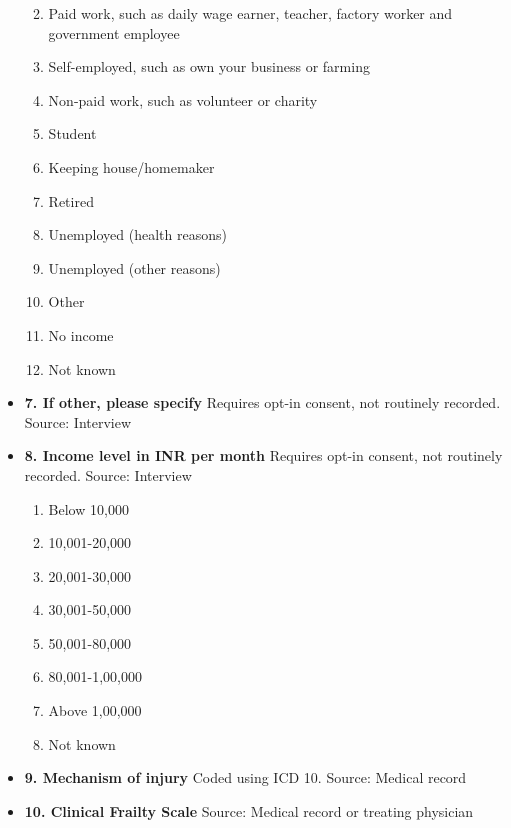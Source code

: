 \documentclass[
]{scrartcl}
\providecommand{\tightlist}{%
  \setlength{\itemsep}{0pt}\setlength{\parskip}{0pt}}\usepackage{longtable,booktabs,array}
\begin{document}
\begin{itemize}
  \begin{enumerate}
  \def\labelenumi{\arabic{enumi}.}
  \tightlist
  \item
    Paid work, such as daily wage earner, teacher, factory worker and
    government employee
  \item
    Self-employed, such as own your business or farming
  \item
    Non-paid work, such as volunteer or charity
  \item
    Student
  \item
    Keeping house/homemaker
  \item
    Retired
  \item
    Unemployed (health reasons)
  \item
    Unemployed (other reasons)
  \item
    Other
  \item
    No income
  \item
    Not known
  \end{enumerate}
\item
  \textbf{7. If other, please specify} Requires opt-in consent, not
  routinely recorded. Source: Interview
\item
  \textbf{8. Income level in INR per month} Requires opt-in consent, not
  routinely recorded. Source: Interview

  \begin{enumerate}
  \def\labelenumi{\arabic{enumi}.}
  \tightlist
  \item
    Below 10,000
  \item
    10,001-20,000
  \item
    20,001-30,000
  \item
    30,001-50,000
  \item
    50,001-80,000
  \item
    80,001-1,00,000
  \item
    Above 1,00,000
  \item
    Not known
  \end{enumerate}
\item
  \textbf{9. Mechanism of injury} Coded using ICD 10. Source: Medical
  record
\item
  \textbf{10. Clinical Frailty Scale} Source: Medical record or treating
  physician


\end{itemize}
\end{document}
